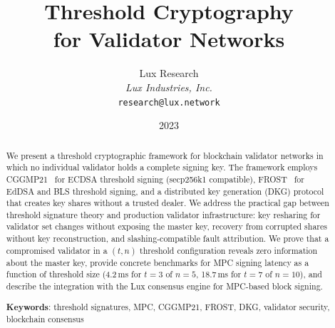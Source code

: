 \documentclass[11pt,a4paper]{article}
\title{\textbf{Threshold Cryptography\\for Validator Networks}}
\author{
Lux Research \\
\textit{Lux Industries, Inc.}\\
\texttt{research@lux.network}
}
\date{2023}
\begin{document}
\luxcoverpage

\begin{abstract}
We present a threshold cryptographic framework for blockchain validator networks in
which no individual validator holds a complete signing key. The framework employs
CGGMP21~\cite{canetti2021uc} for ECDSA threshold signing (secp256k1 compatible),
FROST~\cite{komlo2020frost} for EdDSA and BLS threshold signing, and a distributed
key generation (DKG) protocol that creates key shares without a trusted dealer. We
address the practical gap between threshold signature theory and production validator
infrastructure: key resharing for validator set changes without exposing the master
key, recovery from corrupted shares without key reconstruction, and slashing-compatible
fault attribution. We prove that a compromised validator in a $(t, n)$ threshold
configuration reveals zero information about the master key, provide concrete benchmarks
for MPC signing latency as a function of threshold size (4.2\,ms for $t=3$ of $n=5$,
18.7\,ms for $t=7$ of $n=10$), and describe the integration with the Lux consensus
engine for MPC-based block signing.

\textbf{Keywords}: threshold signatures, MPC, CGGMP21, FROST, DKG, validator security,
blockchain consensus
\end{abstract}

\tableofcontents
\newpage













\end{document}
